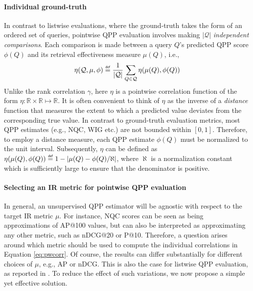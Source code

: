 \paragraph{Individual ground-truth}
In contrast to listwise evaluations, where the ground-truth takes the form of an ordered set of queries, pointwise QPP evaluation involves making $|\mathcal{Q}|$ \textit{independent comparisons}. Each comparison is made between a query $Q$'s predicted QPP score $\phi(Q)$ and its retrieval effectiveness measure $\mu(Q)$, i.e.,
\begin{equation}
\eta(\mathcal{Q}, \mu, \phi) \defas \frac{1}{|\mathcal{Q}|}\sum_{Q \in \mathcal{Q}}\eta(\mu(Q), \phi(Q))
\label{eq:pwcorr}  
\end{equation}
Unlike the rank correlation $\gamma$, 
here $\eta$ is a pointwise correlation function of the form $\eta:\mathbb{R}\times \mathbb{R}\mapsto\mathbb{R}$.
It is often convenient to think of $\eta$ as the inverse of a \emph{distance} function that measures the extent to which a predicted value deviates from the corresponding true value.
In contrast to ground-truth evaluation metrics, most QPP estimates (e.g., NQC, WIG etc.) are not bounded within $[0, 1]$. Therefore, to employ a distance measure, each QPP estimate $\phi(Q)$ must be normalized to the unit interval. Subsequently, $\eta$ can be defined as
$\eta(\mu(Q), \phi(Q)) \defas 1-|\mu(Q) - \phi(Q)/\aleph|$,
where $\aleph$ is a normalization constant which is sufficiently large to ensure that the denominator is positive.

\paragraph{Selecting an IR metric for pointwise QPP evaluation}

In general, an unsupervised QPP estimator will be agnostic with respect to the target IR metric $\mu$. For instance, NQC scores can be seen as being approximations of AP@100 values, but can also be interpreted as approximating any other metric, such as nDCG@20 or P@10. Therefore, a question arises around which metric should be used to compute the individual correlations in Equation \ref{eq:pwcorr}. Of course, the results can differ substantially for different choices of $\mu$, e.g., AP or nDCG. This is also the case for listwise QPP evaluation, as reported in \cite{dg22ecir}. To reduce the effect of such variations, we now propose a simple yet effective solution.

